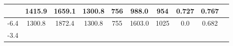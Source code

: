 \documentclass[a4paper,12pt]{article}
\begin{document}
\begin{longtable}{
     |
%    
    c|
%    
    c|
%    
    c|
%    
    c|
%    
    c|
%    
    c|
%    
    c|
%    
    c|
%    
    c|
%    
    c|
%    
    }
%        
        & 1415.9
%        

%        

%        
        & 1659.1
%        

%        

%        
        & 1300.8
%        

%        

%        
        & 756
%        

%        

%        
        & 988.0
%        

%        

%        
        & 954
%        

%        

%        
        & 0.727
%        

%        

%        
        & 0.767
%        

%        
        \\
        \hline

        

%        

%        
        -6.4
%        

%        

%        
        & 1300.8
%        

%        

%        
        & 1872.4
%        

%        

%        
        & 1300.8
%        

%        

%        
        & 755
%        

%        

%        
        & 1603.0
%        

%        

%        
        & 1025
%        

%        

%        
        & 0.0
%        

%        

%        
        & 0.682
%        

%        
        \\
        \hline

        

%        

%        
        -3.4
%        

%        


\end{longtable}
\end{document}
